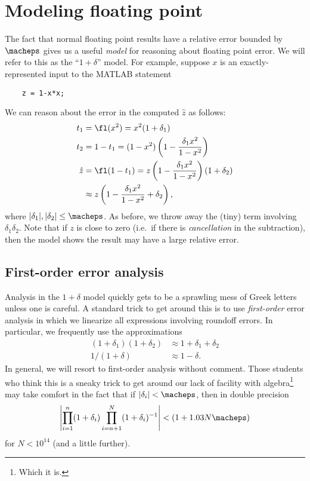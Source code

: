 \section{Modeling floating point}

The fact that normal floating point results have a relative error
bounded by $\macheps$ gives us a useful {\em model} for reasoning about
floating point error.  We will refer to this as the ``$1 + \delta$''
model.  For example, suppose $x$ is an exactly-represented input to
the MATLAB statement
\begin{lstlisting}
    z = 1-x*x;
\end{lstlisting}
We can reason about the error in the computed $\hat{z}$ as follows:
\begin{align*}
  t_1 &= \fl(x^2) = x^2 (1+\delta_1) \\
  t_2 &= 1-t_1 = (1-x^2)\left( 1 - \frac{\delta_1 x^2}{1-x^2} \right) \\
  \hat{z}
  &= \fl(1-t_1)
    = z \left( 1 - \frac{\delta_1 x^2}{1-x^2} \right)(1+\delta_2) \\
  & \approx z \left( 1 - \frac{\delta_1 x^2}{1-x^2} +\delta_2 \right),
\end{align*}
where $|\delta_1|, |\delta_2| \leq \macheps$.  As before, we throw
away the (tiny) term involving $\delta_1 \delta_2$.
Note that if $z$ is close to zero (i.e.~if there is {\em cancellation} in the
subtraction), then the model shows the result may have a
large relative error.

\subsection{First-order error analysis}

Analysis in the $1+\delta$ model quickly gets to be a sprawling mess
of Greek letters unless one is careful.  A standard trick to get
around this is to use {\em first-order} error analysis in which we
linearize all expressions involving roundoff errors.  In particular,
we frequently use the approximations
\begin{align*}
  (1+\delta_1)(1+\delta_2) & \approx 1+\delta_1 + \delta_2 \\
  1/(1+\delta) & \approx 1-\delta.
\end{align*}
In general, we will resort to first-order analysis without comment.
Those students who think this is a sneaky trick to get around our
lack of facility with algebra\footnote{%
Which it is.
}
may take comfort in the fact that if $|\delta_i| < \macheps$, then
in double precision
\[
  \left| \prod_{i=1}^n (1+\delta_i) \prod_{i=n+1}^N (1+\delta_i)^{-1} \right| < (1+1.03 N \macheps)
\]
for $N < 10^{14}$ (and a little further).

